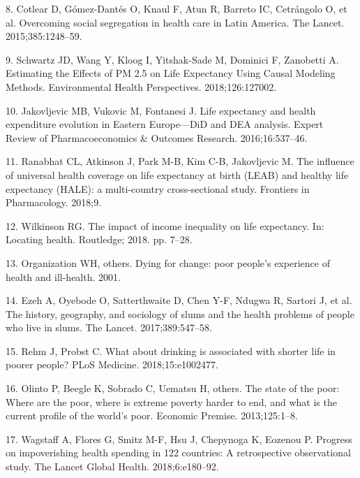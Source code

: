 \documentclass[]{elsarticle} %
\begin{document}
\leavevmode\hypertarget{ref-cotlear2015overcoming}{}%
8. Cotlear D, Gómez-Dantés O, Knaul F, Atun R, Barreto IC, Cetrángolo O, et al. Overcoming social segregation in health care in Latin America. The Lancet. 2015;385:1248--59.

\leavevmode\hypertarget{ref-schwartz2018estimating}{}%
9. Schwartz JD, Wang Y, Kloog I, Yitshak-Sade M, Dominici F, Zanobetti A. Estimating the Effects of PM 2.5 on Life Expectancy Using Causal Modeling Methods. Environmental Health Perspectives. 2018;126:127002.

\leavevmode\hypertarget{ref-jakovljevic2016life}{}%
10. Jakovljevic MB, Vukovic M, Fontanesi J. Life expectancy and health expenditure evolution in Eastern Europe---DiD and DEA analysis. Expert Review of Pharmacoeconomics \& Outcomes Research. 2016;16:537--46.

\leavevmode\hypertarget{ref-ranabhat2018influence}{}%
11. Ranabhat CL, Atkinson J, Park M-B, Kim C-B, Jakovljevic M. The influence of universal health coverage on life expectancy at birth (LEAB) and healthy life expectancy (HALE): a multi-country cross-sectional study. Frontiers in Pharmacology. 2018;9.

\leavevmode\hypertarget{ref-wilkinson2018impact}{}%
12. Wilkinson RG. The impact of income inequality on life expectancy. In: Locating health. Routledge; 2018. pp. 7--28.

\leavevmode\hypertarget{ref-world2001dying}{}%
13. Organization WH, others. Dying for change: poor people's experience of health and ill-health. 2001.

\leavevmode\hypertarget{ref-ezeh2017history}{}%
14. Ezeh A, Oyebode O, Satterthwaite D, Chen Y-F, Ndugwa R, Sartori J, et al. The history, geography, and sociology of slums and the health problems of people who live in slums. The Lancet. 2017;389:547--58.

\leavevmode\hypertarget{ref-rehm2018drinking}{}%
15. Rehm J, Probst C. What about drinking is associated with shorter life in poorer people? PLoS Medicine. 2018;15:e1002477.

\leavevmode\hypertarget{ref-olinto2013state}{}%
16. Olinto P, Beegle K, Sobrado C, Uematsu H, others. The state of the poor: Where are the poor, where is extreme poverty harder to end, and what is the current profile of the world's poor. Economic Premise. 2013;125:1--8.

\leavevmode\hypertarget{ref-wagstaff2018progress}{}%
17. Wagstaff A, Flores G, Smitz M-F, Hsu J, Chepynoga K, Eozenou P. Progress on impoverishing health spending in 122 countries: A retrospective observational study. The Lancet Global Health. 2018;6:e180--92.
\end{document}
